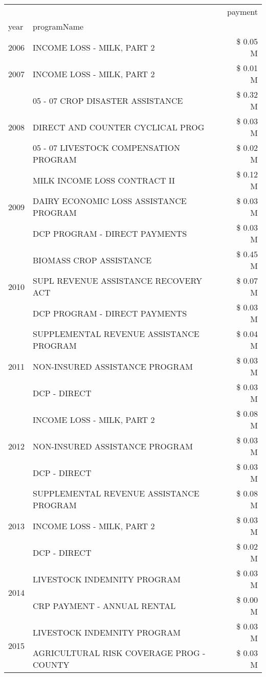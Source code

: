 \begin{tabular}{llr}
\toprule
 &  & payment \\
year & programName &  \\
\midrule
2006 & INCOME LOSS - MILK, PART 2 & \$ 0.05 M \\
\cline{1-3}
2007 & INCOME LOSS - MILK, PART 2 & \$ 0.01 M \\
\cline{1-3}
\multirow[t]{3}{*}{2008} & 05 - 07 CROP DISASTER ASSISTANCE & \$ 0.32 M \\
 & DIRECT AND COUNTER CYCLICAL PROG & \$ 0.03 M \\
 & 05 - 07 LIVESTOCK COMPENSATION PROGRAM & \$ 0.02 M \\
\cline{1-3}
\multirow[t]{3}{*}{2009} & MILK INCOME LOSS CONTRACT II & \$ 0.12 M \\
 & DAIRY ECONOMIC LOSS ASSISTANCE PROGRAM & \$ 0.03 M \\
 & DCP PROGRAM - DIRECT PAYMENTS & \$ 0.03 M \\
\cline{1-3}
\multirow[t]{3}{*}{2010} & BIOMASS CROP ASSISTANCE & \$ 0.45 M \\
 & SUPL REVENUE ASSISTANCE RECOVERY ACT & \$ 0.07 M \\
 & DCP PROGRAM - DIRECT PAYMENTS & \$ 0.03 M \\
\cline{1-3}
\multirow[t]{3}{*}{2011} & SUPPLEMENTAL REVENUE ASSISTANCE PROGRAM & \$ 0.04 M \\
 & NON-INSURED ASSISTANCE PROGRAM & \$ 0.03 M \\
 & DCP - DIRECT & \$ 0.03 M \\
\cline{1-3}
\multirow[t]{3}{*}{2012} & INCOME LOSS - MILK, PART 2 & \$ 0.08 M \\
 & NON-INSURED ASSISTANCE PROGRAM & \$ 0.03 M \\
 & DCP - DIRECT & \$ 0.03 M \\
\cline{1-3}
\multirow[t]{3}{*}{2013} & SUPPLEMENTAL REVENUE ASSISTANCE PROGRAM & \$ 0.08 M \\
 & INCOME LOSS - MILK, PART 2 & \$ 0.03 M \\
 & DCP - DIRECT & \$ 0.02 M \\
\cline{1-3}
\multirow[t]{2}{*}{2014} & LIVESTOCK INDEMNITY PROGRAM & \$ 0.03 M \\
 & CRP PAYMENT - ANNUAL RENTAL & \$ 0.00 M \\
\cline{1-3}
\multirow[t]{3}{*}{2015} & LIVESTOCK INDEMNITY PROGRAM & \$ 0.03 M \\
 & AGRICULTURAL RISK COVERAGE PROG - COUNTY & \$ 0.03 M \\

\end{tabular}
